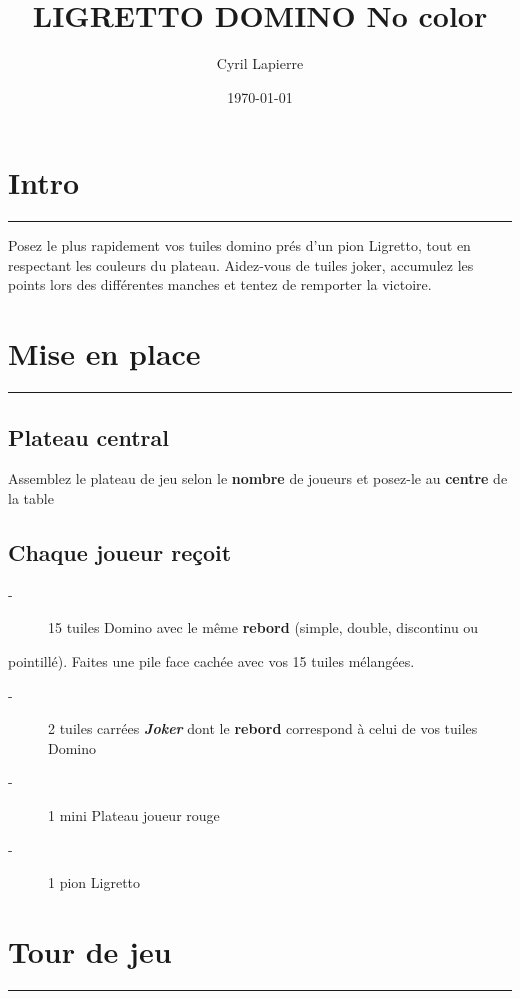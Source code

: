 \documentclass{article}%
\title{LIGRETTO DOMINO No color}%
\author{Cyril Lapierre}%
\date{\today}%
\begin{document}
%
\normalsize%
\maketitle\thispagestyle{header}%
\pagestyle{header}%
\section{ Intro
}%
\label{sec:Intro}%
\rule{18cm}{0.07cm}\break%
Posez le plus rapidement vos tuiles domino prés d'un pion Ligretto, tout en respectant les couleurs du plateau. Aidez{-}vous de tuiles joker, accumulez les points lors des différentes manches et tentez de remporter la victoire.


%
\section{ Mise en place
}%
\label{sec:Miseenplace}%
\rule{18cm}{0.07cm}\break

%
\subsection{ Plateau central
}%
\label{subsec:Plateaucentral}%
Assemblez le plateau de jeu selon le %
\textbf{nombre}%
\textit{ }%
 de joueurs et posez{-}le au %
\textbf{centre}%
\textit{ }%
 de la table


%
\subsection{ Chaque joueur reçoit
}%
\label{subsec:Chaquejoueurreoit}%
\begin{description}%
\item[{-} ]%
%
 15 tuiles Domino avec le même %
\textbf{rebord}%
\textit{ }%
 (simple, double, discontinu ou
%
\end{description}%
pointillé). Faites une pile face cachée avec vos 15 tuiles mélangées.
%
\begin{description}%
\item[{-} ]%
%
 2 tuiles carrées %
\textbf{\textit{Joker}}%
\textit{ }%
 dont le %
\textbf{rebord}%
\textit{ }%
 correspond à celui de vos tuiles Domino
%
\item[{-} ]%
%
 1 mini Plateau joueur rouge
%
\item[{-} ]%
%
 1 pion Ligretto
%
\end{description}

%
\section{ Tour de jeu
}%
\label{sec:Tourdejeu}%
\rule{18cm}{0.07cm}\break
\end{document}
